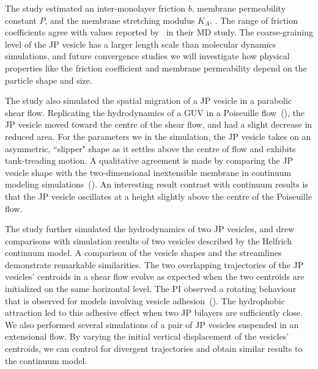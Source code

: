 %
%
The study estimated an inter-monolayer friction $b$, membrane permeability
constant $P$, and the membrane stretching modulus $K_A$.
\cite{chabanon2017, sch-vla-mik2010}.
The range of friction coefficients agree with values reported
by~\cite{denOtter2007} in their MD study. The coarse-graining level of
the JP vesicle has a larger length scale than molecular dynamics
simulations, and future convergence studies we will investigate
how physical properties like the friction coefficient and membrane
permeability depend on the particle shape and size.

The study also simulated the spatial migration of a JP vesicle in a
parabolic shear flow. 
%
Replicating the hydrodynamics of a GUV in a Poiseuille
flow~(\cite{Kaoui09, dan-vla-mis2009, cou-kao-pod-mis2008}), the JP
vesicle moved toward the centre of the shear flow,
and had a slight decrease in reduced area.
For the parameters we in the simulation,
the JP vesicle takes on an asymmetric, ``slipper" shape as it settles
above the centre of flow and exhibits tank-treading motion.
A qualitative
agreement is made by comparing the JP vesicle shape with the
two-dimensional inextensible membrane in continuum modeling
simulations~(\cite{Kaoui09, dan-vla-mis2009, cou-kao-pod-mis2008}). 
An interesting result contrast with continuum results is that the JP
vesicle oscillates at a height slightly above the centre of the
Poiseuille flow. 


The study further simulated the hydrodynamics of two JP vesicles, and drew
comparisons with simulation results of two vesicles described by the
Helfrich continuum model. A comparison of the vesicle shapes and the
streamlines demonstrate remarkable similarities. The two overlapping
trajectories of the JP vesicles' centroids in a shear flow evolve as
expected when the two centroids are initialized on the same horizontal
level. The PI observed a rotating behaviour that is observed for models
involving vesicle adhesion~(\cite{qua-vee-you2019}). The hydrophobic
attraction led to this adhesive effect when two JP bilayers are
sufficiently close. We also performed several simulations of a pair of
JP vesicles suspended in an extensional flow. By varying the initial
vertical displacement of the vesicles' centroids, we can control for
divergent trajectories and obtain similar results to the continuum
model.

